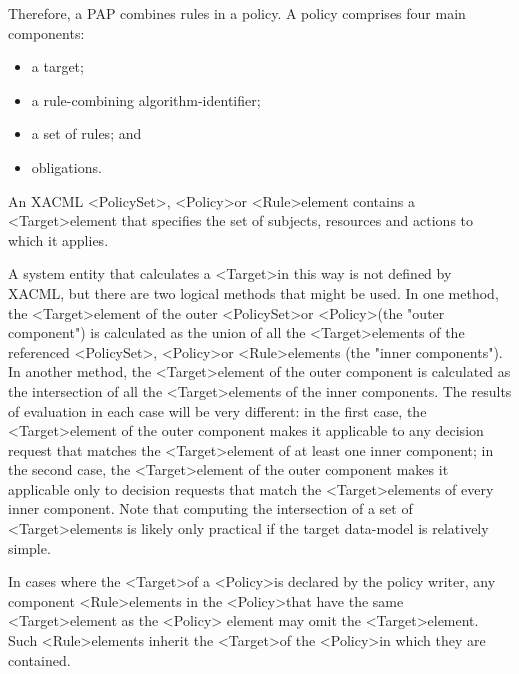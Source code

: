 Therefore, a PAP combines rules in a policy. A policy comprises four main components:
\begin{itemize}
\item a target;
\item a rule-combining algorithm-identifier;
\item a set of rules; and
\item obligations.
\end{itemize}
An XACML \textless PolicySet\textgreater  , \textless Policy\textgreater   or \textless Rule\textgreater   element contains a \textless Target\textgreater   element that
specifies the set of subjects, resources and actions to which it applies.
\par A system entity that calculates a \textless Target\textgreater   in this way is not defined by XACML, but there are two
logical methods that might be used. In one method, the \textless Target\textgreater   element of the outer
\textless PolicySet\textgreater   or \textless Policy\textgreater   (the "outer component") is calculated as the union of all the
\textless Target\textgreater   elements of the referenced \textless PolicySet\textgreater  , \textless Policy\textgreater   or \textless Rule\textgreater   elements (the "inner
components"). In another method, the \textless Target\textgreater   element of the outer component is calculated as
the intersection of all the \textless Target\textgreater   elements of the inner components. The results of evaluation in
each case will be very different: in the first case, the \textless Target\textgreater   element of the outer component
makes it applicable to any decision request that matches the \textless Target\textgreater   element of at least one
inner component; in the second case, the \textless Target\textgreater   element of the outer component makes it
applicable only to decision requests that match the \textless Target\textgreater   elements of every inner
component. Note that computing the intersection of a set of \textless Target\textgreater   elements is likely only
practical if the target data-model is relatively simple.
\par In cases where the \textless Target\textgreater   of a \textless Policy\textgreater   is declared by the policy writer, any component
\textless Rule\textgreater   elements in the \textless Policy\textgreater   that have the same \textless Target\textgreater   element as the \textless Policy\textgreater  
element may omit the \textless Target\textgreater   element. Such \textless Rule\textgreater   elements inherit the \textless Target\textgreater   of the
\textless Policy\textgreater   in which they are contained.














